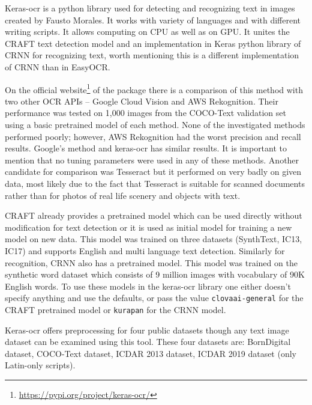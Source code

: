 Keras-ocr is a python library used for detecting and recognizing text in images created by Fausto Morales. It works with variety of languages and with different writing scripts. It allows computing on CPU as well as on GPU.  It unites the CRAFT text detection model and an implementation in Keras python library of CRNN for recognizing text, worth mentioning this is a different implementation of CRNN than in EasyOCR.\cite{keras-ocr1}

On the official website\footnote{\url{https://pypi.org/project/keras-ocr/}} of the package there is a comparison of this method with two other OCR APIs -- Google Cloud Vision and AWS Rekognition. Their performance was tested on 1,000 images from the COCO-Text validation set using a basic pretrained model of each method. None of the investigated methods performed poorly; however, AWS Rekognition had the worst precision and recall results. Google's method and keras-ocr has similar results. It is important to mention that no tuning parameters were used in any of these methods. Another candidate for comparison was Tesseract but it performed on very badly on given data, most likely due to the fact that Tesseract is suitable for scanned documents rather than for photos of real life scenery and objects with text. \cite{keras-ocr1}

CRAFT already provides a pretrained model which can be used directly without modification for text detection or it is used as initial model for training a new model on new data. This model was trained on three datasets (SynthText, IC13, IC17) and supports English and multi language text detection.\cite{craft1}
Similarly for recognition, CRNN also has a pretrained model. This model was trained on the synthetic word dataset which consists of 9 million images with vocabulary of 90K English words.\cite{synth}
To use these models in the keras-ocr library one either doesn't specify anything and use the defaults, or pass the value \texttt{clovaai-general} for the CRAFT pretrained model or \texttt{kurapan} for the CRNN model.

Keras-ocr offers preprocessing for four public datasets though any text image dataset can be examined using this tool. These four datasets are: BornDigital dataset, COCO-Text dataset, ICDAR 2013 dataset, ICDAR 2019 dataset (only Latin-only scripts).\cite{keras-ocrDocu}



